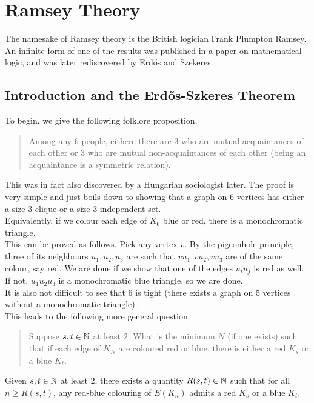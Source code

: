 \section{Ramsey Theory}

The namesake of Ramsey theory is the British logician Frank Plumpton Ramsey. An infinite form of one of the results was published in a paper on mathematical logic, and was later rediscovered by Erd\H{o}s and Szekeres.

\subsection{Introduction and the Erd\H{o}s-Szkeres Theorem}

	To begin, we give the following folklore proposition.
	\begin{quote}
		Among any 6 people, eithere there are $3$ who are mutual acquaintances of each other or $3$ who are mutual non-acquaintances of each other (being an acquaintance is a symmetric relation).
	\end{quote}

	This was in fact also discovered by a Hungarian sociologist later. The proof is very simple and just boils down to showing that a graph on $6$ vertices has either a size $3$ clique or a size $3$ independent set.\\
	Equivalently, if we colour each edge of $K_6$ blue or red, there is a monochromatic triangle.\\
	This can be proved as follows. Pick any vertex $v$. By the pigeonhole principle, three of its neighbours $u_1,u_2,u_3$ are such that $vu_1,vu_2,vu_3$ are of the same colour, say red. We are done if we show that one of the edges $u_iu_j$ is red as well. If not, $u_1u_2u_3$ is a monochromatic blue triangle, so we are done.\\
	It is also not difficult to see that $6$ is tight (there exists a graph on $5$ vertices without a monochromatic triangle).\\

	This leads to the following more general question.
	\begin{quote}
		Suppose $s,t\in\mathbb{N}$ at least $2$. What is the minimum $N$ (if one exists) such that if each edge of $K_N$ are coloured red or blue, there is either a red $K_s$ or a blue $K_t$.
	\end{quote}


	\begin{ftheo}
		\label{theo: ramsey number finite}
		Given $s,t\in\mathbb{N}$ at least $2$, there exists a quantity $R(s,t) \in \mathbb{N}$ such that for all $n \ge R(s,t)$, any red-blue colouring of $E(K_n)$ admits a red $K_s$ or a blue $K_t$.
	\end{ftheo}

